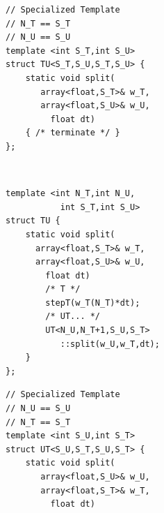 \begin{figure}[ht]
	\begin{minipage}[c]{\textwidth}
		\begin{minipage}[l][10cm][t]{.4\textwidth}
			\begin{minipage}[t]{\textwidth}
\begin{lstlisting}
// Specialized Template
// N_T == S_T
// N_U == S_U
template <int S_T,int S_U>
struct TU<S_T,S_U,S_T,S_U> {
	static void split(
	   array<float,S_T>& w_T,
	   array<float,S_U>& w_U,
		 float dt)
	{ /* terminate */ }
};
\end{lstlisting}
			\end{minipage} \\
			\vspace{5mm}
			\begin{minipage}[t]{\textwidth}
\begin{lstlisting}
template <int N_T,int N_U,
           int S_T,int S_U>
struct TU {
	static void split(
	  array<float,S_T>& w_T,
	  array<float,S_U>& w_U,
		float dt)
		/* T */
		stepT(w_T(N_T)*dt);
		/* UT... */
		UT<N_U,N_T+1,S_U,S_T>
		   ::split(w_U,w_T,dt);
	}
};
\end{lstlisting}
			\end{minipage}
	\end{minipage}
		\begin{minipage}[l][10cm][t]{.18\textwidth}
			\vspace{25mm}
		\end{minipage}
	\begin{minipage}[r][10cm][t]{.4\textwidth}
			\begin{minipage}[t]{\textwidth}
\begin{lstlisting}
// Specialized Template
// N_U == S_U
// N_T == S_T
template <int S_U,int S_T>
struct UT<S_U,S_T,S_U,S_T> {
	static void split(
	   array<float,S_U>& w_U,
	   array<float,S_T>& w_T,
		 float dt)

\end{lstlisting}
\end{minipage}
\end{minipage}
\end{minipage}
\end{figure}
